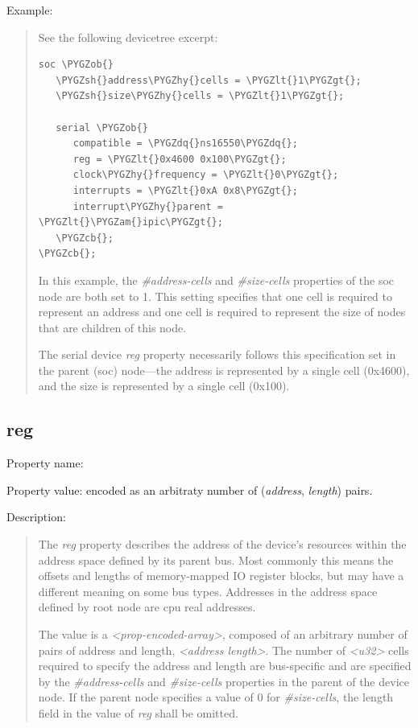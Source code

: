 \documentclass[a4paper,10pt,oneside]{sphinxmanual}
\def\PYGZob{\char`\{}
\def\PYGZcb{\char`\}}
\def\PYGZam{\char`\&}
\def\PYGZlt{\char`\<}
\def\PYGZgt{\char`\>}
\def\PYGZsh{\char`\#}
\def\PYGZhy{\char`\-}
\def\PYGZdq{\char`\"}
\begin{document}
Example:
\begin{quote}

See the following devicetree excerpt:

\begin{Verbatim}[commandchars=\\\{\}]
soc \PYGZob{}
   \PYGZsh{}address\PYGZhy{}cells = \PYGZlt{}1\PYGZgt{};
   \PYGZsh{}size\PYGZhy{}cells = \PYGZlt{}1\PYGZgt{};

   serial \PYGZob{}
      compatible = \PYGZdq{}ns16550\PYGZdq{};
      reg = \PYGZlt{}0x4600 0x100\PYGZgt{};
      clock\PYGZhy{}frequency = \PYGZlt{}0\PYGZgt{};
      interrupts = \PYGZlt{}0xA 0x8\PYGZgt{};
      interrupt\PYGZhy{}parent = \PYGZlt{}\PYGZam{}ipic\PYGZgt{};
   \PYGZcb{};
\PYGZcb{};
\end{Verbatim}

In this example, the \emph{\#address-cells} and \emph{\#size-cells} properties of the soc node
are both set to 1. This setting specifies that one cell is required to
represent an address and one cell is required to represent the size of
nodes that are children of this node.

The serial device \emph{reg} property necessarily follows this specification
set in the parent (soc) node—the address is represented by a single cell
(0x4600), and the size is represented by a single cell (0x100).
\end{quote}


\subsection{reg}
\label{devicetree-basics:reg}
Property name: 

Property value:  encoded as an arbitraty number of (\emph{address}, \emph{length}) pairs.

Description:
\begin{quote}

The \emph{reg} property describes the address of the device’s resources
within the address space defined by its parent bus. Most commonly this
means the offsets and lengths of memory-mapped IO register blocks, but
may have a different meaning on some bus types. Addresses in the address
space defined by root node are cpu real addresses.

The value is a \emph{\textless{}prop-encoded-array\textgreater{}}, composed of an arbitrary number
of pairs of address and length, \emph{\textless{}address length\textgreater{}}. The number of
\emph{\textless{}u32\textgreater{}} cells required to specify the address and length are
bus-specific and are specified by the \emph{\#address-cells} and \emph{\#size-cells}
properties in the parent of the device node. If the parent node
specifies a value of 0 for \emph{\#size-cells}, the length field in the value
of \emph{reg} shall be omitted.
\end{quote}
\end{document}
